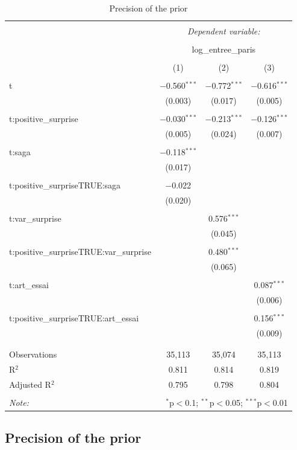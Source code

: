 \begin{table}[!htbp] \centering 
	\caption{Precision of the prior} 
	\label{} 
	\begin{tabular}{@{\extracolsep{5pt}}lccc} 
		\\[-1.8ex]\hline 
		\hline \\[-1.8ex] 
		& \multicolumn{3}{c}{\textit{Dependent variable:}} \\ 
		\cline{2-4} 
		\\[-1.8ex] & \multicolumn{3}{c}{log\_entree\_paris} \\ 
		\\[-1.8ex] & (1) & (2) & (3)\\ 
		\hline \\[-1.8ex] 
		t & $-$0.560$^{***}$ & $-$0.772$^{***}$ & $-$0.616$^{***}$ \\ 
		& (0.003) & (0.017) & (0.005) \\ 
		& & & \\ 
		t:positive\_surprise & $-$0.030$^{***}$ & $-$0.213$^{***}$ & $-$0.126$^{***}$ \\ 
		& (0.005) & (0.024) & (0.007) \\ 
		& & & \\ 
		t:saga & $-$0.118$^{***}$ &  &  \\ 
		& (0.017) &  &  \\ 
		& & & \\ 
		t:positive\_surpriseTRUE:saga & $-$0.022 &  &  \\ 
		& (0.020) &  &  \\ 
		& & & \\ 
		t:var\_surprise &  & 0.576$^{***}$ &  \\ 
		&  & (0.045) &  \\ 
		& & & \\ 
		t:positive\_surpriseTRUE:var\_surprise &  & 0.480$^{***}$ &  \\ 
		&  & (0.065) &  \\ 
		& & & \\ 
		t:art\_essai &  &  & 0.087$^{***}$ \\ 
		&  &  & (0.006) \\ 
		& & & \\ 
		t:positive\_surpriseTRUE:art\_essai &  &  & 0.156$^{***}$ \\ 
		&  &  & (0.009) \\ 
		& & & \\ 
		\hline \\[-1.8ex] 
		Observations & 35,113 & 35,074 & 35,113 \\ 
		R$^{2}$ & 0.811 & 0.814 & 0.819 \\ 
		Adjusted R$^{2}$ & 0.795 & 0.798 & 0.804 \\ 
		\hline 
		\hline \\[-1.8ex] 
		\textit{Note:}  & \multicolumn{3}{r}{$^{*}$p$<$0.1; $^{**}$p$<$0.05; $^{***}$p$<$0.01} \\ 
	\end{tabular} 
\end{table} 

\subsection{Precision of the prior}